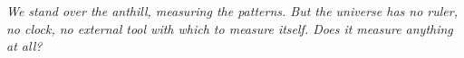 \cleardoublepage
\thispagestyle{empty}

\begin{center}
  \vspace*{\fill} %


  \bigskip

  \begin{minipage}{0.80\textwidth}
    \epigraph{
      \textit{We stand over the anthill, measuring the patterns. But the universe has no ruler, no clock,
      no external tool with which to measure itself. Does it measure anything at all?}
    }{}
  \end{minipage}

  \vspace*{\fill} %
\end{center}

